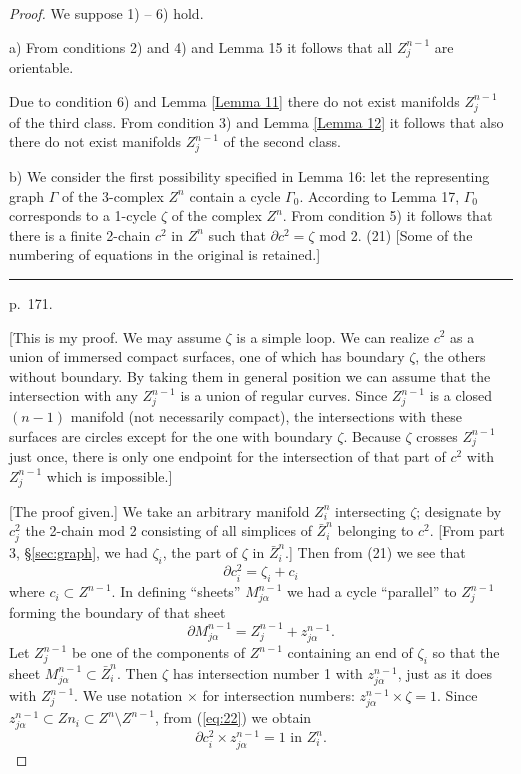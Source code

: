 \documentclass{amsart}
\theoremstyle{plain}
\theoremstyle{definition}
\begin{document}
\begin{proof} We suppose 1) -- 6) hold.

a) From conditions 2) and 4) and Lemma 15 it follows that all
$Z^{n-1}_j$ are orientable.

Due to condition 6) and Lemma \ref{Lemma 11} there do not exist manifolds
$Z^{n-1}_j$ of the third class. From condition 3) and Lemma \ref{Lemma 12}
it follows that also there do not exist manifolds $Z^{n-1}_j$ of
the second class.

b) We consider the first possibility specified in Lemma 16: let
the representing graph $\Gamma$ of the 3-complex $Z^n$ contain
a cycle $\Gamma_0$. According to Lemma 17, $\Gamma_0$
corresponds to a 1-cycle $\zeta$ of the complex $Z^n$. From
condition 5) it follows that there is a finite 2-chain $c^2$ in
$Z^n$ such that $\partial c^2 = \zeta$ mod 2. (21) [Some of the numbering of equations in the original is retained.]

\medskip
\hrule\smallskip
\noindent p.~171.
\medskip

[This is my proof. We may assume $\zeta$ is a simple loop. We can realize $c^2$ as a union of immersed
compact surfaces, one of which has boundary $\zeta$, the others
without boundary. By taking them in general position we can
assume that the intersection with any $Z^{n-1}_j$ is a union of
regular curves. Since $Z^{n-1}_j$ is a closed $(n-1)$ manifold
(not necessarily compact), the intersections with these surfaces
are circles except for the one with boundary $\zeta$. Because
$\zeta$ crosses $Z^{n-1}_j$ just once, there is only one endpoint
for the intersection of that part of $c^2$ with $Z^{n-1}_j$ which
is impossible.]

[The proof given.] We take an arbitrary manifold $Z^n_i$
intersecting $\zeta$; designate by $c^2_j$ the 2-chain mod 2
consisting of all simplices of ${\bar Z}^n_i$ belonging to $c^2$.
[From part 3, \S \ref{sec:graph}, we had $\zeta_i$, the part of $\zeta$ in
${\bar Z}^n_i$.] Then from (21) we see that 
\begin{equation}\partial c^2_i = \zeta_i + c_i \label{eq:22}
\end{equation}
where $c_i \subset Z^{n-1}$. In defining ``sheets''
$M^{n-1}_{j\alpha}$ we had a cycle ``parallel'' to $Z^{n-1}_j$
forming the boundary of that sheet
$$\partial M^{n-1}_{j\alpha} = Z^{n-1}_j + z^{n-1}_{j\alpha}.$$
Let $Z^{n-1}_j$ be one of the components of $Z^{n-1}$ containing
an end of $\zeta_i$ so that the sheet $M^{n-1}_{j\alpha} \subset
{\bar Z}^n_i$. Then $\zeta$ has intersection number 1 with
$z^{n-1}_{j\alpha}$, just as it does with $Z^{n-1}_j$. We use
notation $\times$ for intersection numbers: $z^{n-1}_{j\alpha}
\times \zeta = 1$. Since $z^{n-1}_{j\alpha} \subset Zn_i \subset
Z^n \setminus Z^{n-1}$, from (\ref{eq:22}) we obtain
\begin{equation}\partial c^2_i \times z^{n-1}_{j\alpha} = 1 \text{ in } Z^n_i.
\label{eq:23}
\end{equation}


\end{proof}
\end{document}
